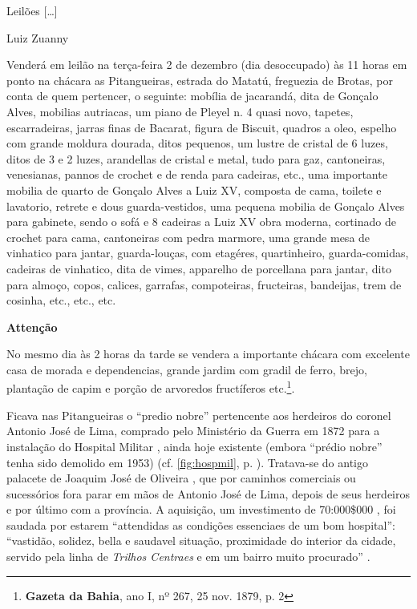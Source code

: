 \begin{citacao}
Leilões [\dots]

Luiz Zuanny 

Venderá em leilão na terça-feira 2 de dezembro (dia desoccupado) às 11 horas em ponto na chácara as Pitangueiras, estrada do Matatú, freguezia de Brotas, por conta de quem pertencer, o seguinte: mobília de jacarandá, dita de Gonçalo Alves, mobilias autriacas, um piano de Pleyel n. 4 quasi novo, tapetes, escarradeiras, jarras finas de Bacarat, figura de Biscuit, quadros a oleo, espelho com grande moldura dourada, ditos pequenos, um lustre de cristal de 6 luzes, ditos de 3 e 2 luzes, arandellas de cristal e metal, tudo para gaz, cantoneiras, venesianas, pannos de crochet e de renda para cadeiras, etc., uma importante mobilia de quarto de Gonçalo Alves a Luiz XV, composta de cama, toilete e lavatorio, retrete e dous guarda-vestidos, uma pequena mobilia de Gonçalo Alves para gabinete, sendo o sofá e 8 cadeiras a Luiz XV obra moderna, cortinado de crochet para cama, cantoneiras com pedra marmore, uma grande mesa de vinhatico para jantar, guarda-louças, com etagéres, quartinheiro, guarda-comidas, cadeiras de vinhatico, dita de vimes, apparelho de porcellana para jantar, dito para almoço, copos, calices, garrafas, compoteiras, fructeiras, bandeijas, trem de cosinha, etc., etc., etc.

\textbf{Attenção}

No mesmo dia às 2 horas da tarde se vendera a importante chácara com excelente casa de morada e dependencias, grande jardim com gradil de ferro, brejo, plantação de capim e porção de arvoredos fructíferos etc.\footnote{\textbf{Gazeta da Bahia}, ano I, nº 267, 25 nov. 1879, p. 2}.
\end{citacao}

Ficava nas Pitangueiras o ``predio nobre'' pertencente aos herdeiros do coronel Antonio José de Lima, comprado pelo Ministério da Guerra em 1872 para a instalação do Hospital Militar \cite[p.~30]{bahia_1872}, ainda hoje existente (embora ``prédio nobre'' tenha sido demolido em 1953) (cf. \autoref{fig:hospmil}, p. \pageref{fig:hospmil}). Tratava-se do antigo palacete de Joaquim José de Oliveira \cite[p.~36]{bahia_rpe_1874}, que por caminhos comerciais ou sucessórios fora parar em mãos de Antonio José de Lima, depois de seus herdeiros e por último com a província. A aquisição, um investimento de 70:000\$000 \cite[p.~10]{bahia_1872}, foi saudada por estarem ``attendidas as condições essenciaes de um bom hospital'': ``vastidão, solidez, bella e saudavel situação, proximidade do interior da cidade, servido pela linha de \textit{Trilhos Centraes} e em um bairro muito procurado'' \cite[p.~31]{bahia_1872}.

